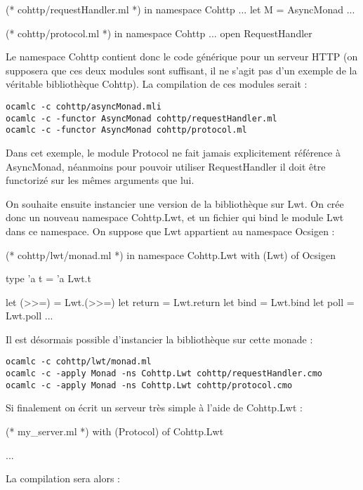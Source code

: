 \documentclass[11pt,a4paper]{report}
\begin{document}
\begin{OCaml}
(* cohttp/requestHandler.ml *)
in namespace Cohttp
...
let M = AsyncMonad
...
\end{OCaml}

\begin{OCaml}
(* cohttp/protocol.ml *)
in namespace Cohttp
...
open RequestHandler
\end{OCaml}

Le namespace Cohttp contient donc le code générique pour un serveur HTTP (on
supposera que ces deux modules sont suffisant, il ne s'agit pas d'un exemple de
la véritable bibliothèque Cohttp). La compilation de ces modules serait :
\begin{verbatim}
ocamlc -c cohttp/asyncMonad.mli
ocamlc -c -functor AsyncMonad cohttp/requestHandler.ml
ocamlc -c -functor AsyncMonad cohttp/protocol.ml
\end{verbatim}

Dans cet exemple, le module Protocol ne fait jamais explicitement référence à
AsyncMonad, néanmoins pour pouvoir utiliser RequestHandler il doit être
functorizé sur les mêmes arguments que lui.

On souhaite ensuite instancier une version de la bibliothèque sur Lwt. On crée
donc un nouveau namespace Cohttp.Lwt, et un fichier qui bind le module Lwt dans
ce namespace. On suppose que Lwt appartient au namespace Ocsigen :
\begin{OCaml}
(* cohttp/lwt/monad.ml *)
in namespace Cohttp.Lwt
with (Lwt) of Ocsigen

type 'a t = 'a Lwt.t

let (>>=) = Lwt.(>>=)
let return = Lwt.return
let bind = Lwt.bind
let poll = Lwt.poll
...
\end{OCaml} 

Il est désormais possible d'instancier la bibliothèque sur cette monade :

\begin{verbatim}
ocamlc -c cohttp/lwt/monad.ml
ocamlc -c -apply Monad -ns Cohttp.Lwt cohttp/requestHandler.cmo
ocamlc -c -apply Monad -ns Cohttp.Lwt cohttp/protocol.cmo
\end{verbatim}

Si finalement on écrit un serveur très simple à l'aide de Cohttp.Lwt :
\begin{OCaml}
(* my_server.ml *)
with (Protocol) of Cohttp.Lwt

...
\end{OCaml}

La compilation sera alors :
\end{document}

